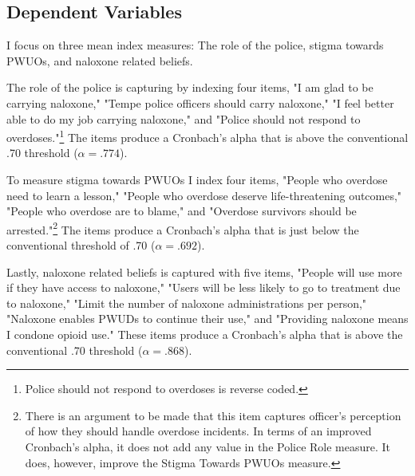 \subsection{Dependent Variables}

I focus on three mean index measures: The role of the police, stigma towards PWUOs, and naloxone related beliefs. 

The role of the police is capturing by indexing four items, "I am glad to be carrying naloxone," "Tempe police officers should carry naloxone," "I feel better able to do my job carrying naloxone," and "Police should not respond to overdoses."\footnote{Police should not respond to overdoses is reverse coded.} The items produce a Cronbach's alpha that is above the conventional .70 threshold (\(\alpha = .774\)).

To measure stigma towards PWUOs I index four items, "People who overdose need to learn a lesson," "People who overdose deserve life-threatening outcomes," "People who overdose are to blame," and "Overdose survivors should be arrested."\footnote{There is an argument to be made that this item captures officer's perception of how they should handle overdose incidents. In terms of an improved Cronbach's alpha, it does not add any value in the Police Role measure. It does, however, improve the Stigma Towards PWUOs measure.} The items produce a Cronbach's alpha that is just below the conventional threshold of .70 (\(\alpha = .692\)).

Lastly, naloxone related beliefs is captured with five items, "People will use more if they have access to naloxone," "Users will be less likely to go to treatment due to naloxone," "Limit the number of naloxone administrations per person," "Naloxone enables PWUDs to continue their use," and "Providing naloxone means I condone opioid use." These items produce a Cronbach's alpha that is above the conventional .70 threshold (\(\alpha = .868\)).

